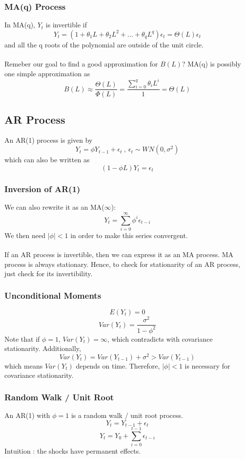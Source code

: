 \documentclass{article}
\begin{document}
\subsubsection{MA(q) Process}
In MA(q), $Y_t$ is invertible if 
$$Y_t = (1 + \theta_1 L + \theta_2 L^2 + ... + \theta_q L^q)\epsilon_t = \Theta(L)\epsilon_t$$
and all the q roots of the polynomial are outside of the unit circle.\\
\\
Remeber our goal to find a good approximation for $B(L)$? MA(q) is possibly one simple approximation as
$$B(L) \approx \frac{\Theta(L)}{\Phi(L)} = \frac{\sum_{i=0}^q \theta_i L^i}{1} = \Theta(L)$$

\subsection{AR Process}
An AR(1) process is given by
$$Y_t = \phi Y_{t-1} + \epsilon_t \ , \ \epsilon_t \sim WN(0, \sigma^2)$$
which can also be written as
$$(1-\phi L)Y_t = \epsilon_t$$

\subsubsection{Inversion of AR(1)}
We can also rewrite it as an MA($\infty$):
$$Y_t = \sum_{i=0}^\infty \phi^i \epsilon_{t-i}$$
We then need $|\phi| < 1$ in order to make this series convergent. \\
\\
If an AR process is invertible, then we can express it as an MA process. MA process is always stationary. Hence, to check for stationarity of an AR process, just check for its invertibility.

\subsubsection{Unconditional Moments}
$$E(Y_t) = 0$$
$$Var(Y_t) = \frac{\sigma^2}{1-\phi^2}$$
Note that if $\phi = 1$, $Var(Y_t) = \infty$, which contradicts with covariance stationarity. Additionally, 
$$Var(Y_t) = Var(Y_{t-1}) + \sigma^2 > Var(Y_{t-1})$$
which means $Var(Y_t)$ depends on time. Therefore, $|\phi| < 1$ is necessary for covariance stationarity.

\subsubsection{Random Walk / Unit Root}
An AR(1) with $\phi = 1$ is a random walk / unit root process.
$$Y_t = Y_{t-1} + \epsilon_t$$
$$Y_t = Y_0 + \sum_{i=0}^{t-1} \epsilon_{t-i}$$
Intuition : the shocks have permanent effects.
\end{document}
